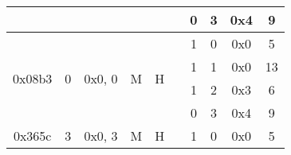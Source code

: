 \documentclass[11pt]{homework}
\newcommand{\xmark}{\ding{55}}%
\begin{document}
\begin{arabicparts}
{\begin{tabular}{|c|c|c|c|c|c|c|c|c|c|}
            \cline{7-10}
                                     &                                                                        &                             &                                                                   &                                                                    &                                                                      & 0                        & 3     & 0x4 & 9             \\
            \hline
            \multirow{4}{*}{0x08b3}  & \multirow{4}{*}{0}                                                     & \multirow{4}{*}{0x0, 0}     & \multirow{4}{*}{M}                                                & \multirow{4}{*}{H}                                                 & \multirow{4}{*}{\xmark}                                              & 1                        & 0     & 0x0 & 5             \\
            \cline{7-10}
                                     &                                                                        &                             &                                                                   &                                                                    &                                                                      & 1                        & 1     & 0x0 & 13            \\
            \cline{7-10}
                                     &                                                                        &                             &                                                                   &                                                                    &                                                                      & 1                        & 2     & 0x3 & 6             \\
            \cline{7-10}
                                     &                                                                        &                             &                                                                   &                                                                    &                                                                      & 0                        & 3     & 0x4 & 9             \\
            \hline
            \multirow{4}{*}{0x365c}  & \multirow{4}{*}{3}                                                     & \multirow{4}{*}{0x0, 3}     & \multirow{4}{*}{M}                                                & \multirow{4}{*}{H}                                                 & \multirow{4}{*}{\xmark}                                              & 1                        & 0     & 0x0 & 5             \\

\end{tabular}}
\end{arabicparts}
\end{document}
